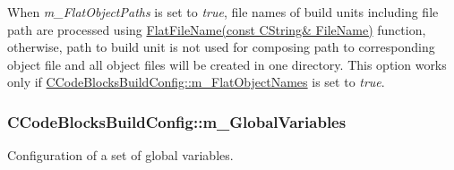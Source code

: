 When {\itshape m\-\_\-\-Flat\-Object\-Paths} is set to {\itshape true}, file names of build units including file path are processed using \hyperlink{cbhelper_8h_af77c55aaae54cacd51a80bd4cb56b939}{Flat\-File\-Name(const C\-String\& File\-Name)} function, otherwise, path to build unit is not used for composing path to corresponding object file and all object files will be created in one directory. This option works only if \hyperlink{classCCodeBlocksBuildConfig_a1e3f7ffab14887951b2d8d743354e786}{C\-Code\-Blocks\-Build\-Config\-::m\-\_\-\-Flat\-Object\-Names} is set to {\itshape true}. \hypertarget{classCCodeBlocksBuildConfig_ac534f72effbbb05a79e9af4c04b93f4d}{
\subsubsection[{m\-\_\-\-Global\-Variables}]{\setlength{\rightskip}{0pt plus 5cm}C\-Code\-Blocks\-Build\-Config\-::m\-\_\-\-Global\-Variables\hspace{0.3cm}{\ttfamily [private]}}}\label{classCCodeBlocksBuildConfig_ac534f72effbbb05a79e9af4c04b93f4d}


Configuration of a set of global variables. 

